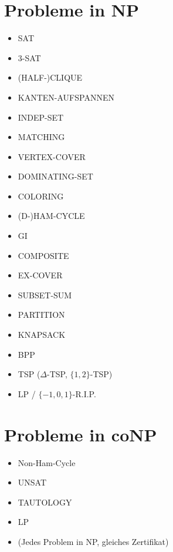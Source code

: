 \documentclass[a4paper,graphics,11pt]{article}
\begin{document}
\begin{minipage}{.5\textwidth}
\section*{Probleme in \textsf{NP}}

\begin{itemize}
    \item SAT
    \item 3-SAT
    \item (HALF-)CLIQUE
    \item KANTEN-AUFSPANNEN
    \item INDEP-SET
    \item MATCHING
    \item VERTEX-COVER
    \item DOMINATING-SET
    \item COLORING
    \item (D-)HAM-CYCLE
    \item GI
    \item COMPOSITE
    \item EX-COVER
    \item SUBSET-SUM
    \item PARTITION
    \item KNAPSACK
    \item BPP
    \item TSP ($\Delta$-TSP, $\{1,2\}$-TSP)
    \item LP / $\{-1,0,1\}$-R.I.P.
\end{itemize}
\end{minipage}
\begin{minipage}{.5\textwidth}
    \section*{Probleme in \textsf{coNP}}

    \begin{itemize}
        \item Non-Ham-Cycle
        \item UNSAT
        \item TAUTOLOGY
        \item LP
        \item (Jedes Problem in NP, gleiches Zertifikat)
    \end{itemize}

\end{minipage}

\newpage
\end{document}
